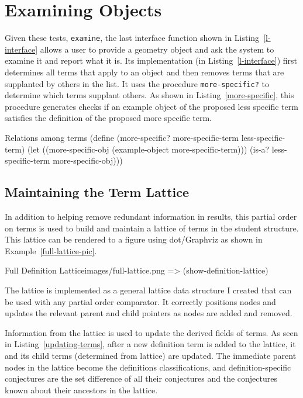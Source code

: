 \section{Examining Objects}

Given these tests, \texttt{examine}, the last interface function shown
in Listing~\ref{l-interface} allows a user to provide a geometry
object and ask the system to examine it and report what it is. Its
implementation (in Listing~\ref{l-interface}) first determines all
terms that apply to an object and then removes terms that are
supplanted by others in the list. It uses the procedure
\texttt{more-specific?} to determine which terms supplant others. As
shown in Listing~\ref{more-specific}, this procedure generates checks
if an example object of the proposed less specific term satisfies the
definition of the proposed more specific term.

\begin{code-listing}
[label=more-specific]
{Relations among terms}
(define (more-specific? more-specific-term less-specific-term)
  (let ((more-specific-obj (example-object more-specific-term)))
    (is-a? less-specific-term more-specific-obj)))
\end{code-listing}


\subsection{Maintaining the Term Lattice}

In addition to helping remove redundant information in results, this
partial order on terms is used to build and maintain a lattice of
terms in the student structure. This lattice can be rendered to a
figure using dot/Graphviz as shown in Example~\ref{full-lattice-pic}.

\begin{img-example}
[label=full-lattice-pic,
breakable=false,
comment style={size=fbox,frame hidden,height=8cm}]
{Full Definition Lattice}{images/full-lattice.png}
=> (show-definition-lattice)
\end{img-example}

The lattice is implemented as a general lattice data structure I
created that can be used with any partial order comparator. It
correctly positions nodes and updates the relevant parent and child
pointers as nodes are added and removed.

Information from the lattice is used to update the derived fields of
terms. As seen in Listing~\ref{updating-terms}, after a new definition
term is added to the lattice, it and its child terms (determined from
lattice) are updated. The immediate parent nodes in the lattice become
the definitions classifications, and definition-specific conjectures
are the set difference of all their conjectures and the conjectures
known about their ancestors in the lattice.

